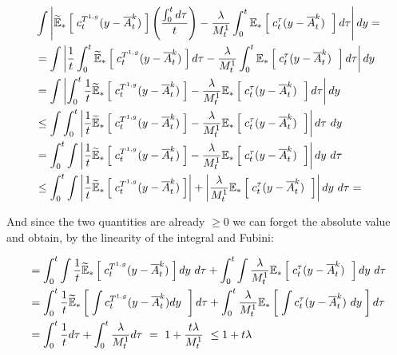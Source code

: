 	\begin{align*}
		&
		\int				
		\left| 
			\widetilde{\mathbb{E}}_{\ast} \left[ \; 
				c_t^{T^{1,g}}
				(y - \overline{A}_t^k)
			 \; \right]
			\left(
			\frac{\int_0^t d\tau}{t}
			\right)
			-
			\frac{\lambda}{M_t^1}
			\int_0^t
			\mathbb{E}_{\ast} \left[ \; 
				c_t^{\tau}
				(y - \overline{A}_t^k)\
			 \; \right]
			d\tau
		 \right|
		dy =
		\\
		&= \int				
		\left| 
			\frac{1}{t}
			\int_0^t 
			\widetilde{\mathbb{E}}_{\ast} \left[ \; 
				c_t^{T^{1,g}}
				(y - \overline{A}_t^k)
			 \; \right]
			d\tau
			-
			\frac{\lambda}{M_t^1}
			\int_0^t
			\mathbb{E}_{\ast} \left[ \; 
				c_t^{\tau}
				(y - \overline{A}_t^k)\
			 \; \right]
			d\tau
		 \right|
		dy
		\\
		&=
		\int				
		\left| 
			\int_0^t
			\frac{1}{t}
			\widetilde{\mathbb{E}}_{\ast} \left[ \; 
				c_t^{T^{1,g}}
				(y - \overline{A}_t^k)
			 \; \right]
			-
			\frac{\lambda}{M_t^1}
			\mathbb{E}_{\ast} \left[ \; 
				c_t^{\tau}
				(y - \overline{A}_t^k)\
			 \; \right]
			d\tau
		 \right|
		dy
		\\
		&\leq
		\int
		\int_0^t		
		\left| 
			\frac{1}{t}
			\widetilde{\mathbb{E}}_{\ast} \left[ \; 
				c_t^{T^{1,g}}
				(y - \overline{A}_t^k)
			 \; \right]
			-
			\frac{\lambda}{M_t^1}
			\mathbb{E}_{\ast} \left[ \; 
				c_t^{\tau}
				(y - \overline{A}_t^k)\
			 \; \right]
		 \right|
		d\tau\
		dy
		\\
		&=
		\int_0^t
		\int
		\left| 
			\frac{1}{t}
			\widetilde{\mathbb{E}}_{\ast} \left[ \; 
				c_t^{T^{1,g}}
				(y - \overline{A}_t^k)
			 \; \right]
			-
			\frac{\lambda}{M_t^1}
			\mathbb{E}_{\ast} \left[ \; 
				c_t^{\tau}
				(y - \overline{A}_t^k)\
			 \; \right]
		 \right|
		dy\
		d\tau
		\\
		&\leq
		\int_0^t
		\int
		\left| 
			\frac{1}{t}
			\widetilde{\mathbb{E}}_{\ast} \left[ \; 
				c_t^{T^{1,g}}
				(y - \overline{A}_t^k)
			 \; \right]
		 \right|
		+
		\left| 
			\frac{\lambda}{M_t^1}
			\mathbb{E}_{\ast} \left[ \; 
				c_t^{\tau}
				(y - \overline{A}_t^k)\
			 \; \right]
		 \right|
		dy\
		d\tau = 
	\end{align*}
	
	And since the two quantities are already $\geq 0$ we can forget the absolute value and obtain, by the linearity of the integral and Fubini:
	
	\begin{align*}
		&=
		\int_0^t
		\int
		\frac{1}{t}
		\widetilde{\mathbb{E}}_{\ast} \left[ \; 
			c_t^{T^{1,g}}
			(y - \overline{A}_t^k)
		 \; \right]
		dy\
		d\tau
		+
		\int_0^t
		\int
		\frac{\lambda}{M_t^1}
		\mathbb{E}_{\ast} \left[ \; 
			c_t^{\tau}
			(y - \overline{A}_t^k)\
		 \; \right]
		dy\
		d\tau
		\\
		&=
		\int_0^t
		\frac{1}{t}
		\widetilde{\mathbb{E}}_{\ast} \left[ \; 
			\int
			c_t^{T^{1,g}}
			(y - \overline{A}_t^k)
			dy\
		 \; \right]
		d\tau
		+
		\int_0^t
		\frac{\lambda}{M_t^1}
		\mathbb{E}_{\ast} \left[ \; 
			\int
			c_t^{\tau}
			(y - \overline{A}_t^k)\
			dy
		 \; \right]
		d\tau
		\\
		&= 
		\int_0^t
		\frac{1}{t}
		d\tau
		+
		\int_0^t
		\frac{\lambda}{M_t^1}
		d\tau\
		=\
		1
		+
		\frac{t\lambda}{M_t^1}\
		\leq
		1 + t\lambda
	\end{align*}
	
